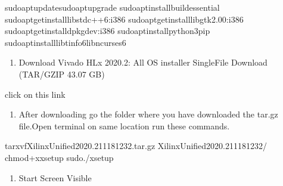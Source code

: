 \documentclass[letterpaper,10pt,english]{sphinxmanual}
\begin{document}
\begin{sphinxVerbatim}[commandchars=\\\{\}]
sudoaptupdatesudoaptupgrade
sudoaptinstallbuild\PYGZhy{}essential
sudoapt\PYGZhy{}getinstalllibstdc++6:i386
sudoapt\PYGZhy{}getinstalllibgtk2.0\PYGZhy{}0:i386
sudoapt\PYGZhy{}getinstalldpkg\PYGZhy{}dev:i386
sudoaptinstallpython3\PYGZhy{}pip
sudoaptinstalllibtinfo6libncurses6
\end{sphinxVerbatim}
\begin{enumerate}
%
\setcounter{enumi}{1}
\item {} 
\sphinxAtStartPar
Download Vivado HLx 2020.2: All OS installer Single\sphinxhyphen{}File Download (TAR/GZIP \sphinxhyphen{} 43.07 GB)

\end{enumerate}

\sphinxAtStartPar
click on this link 

\begin{figure}[htbp]
\centering

\noindent{}
\end{figure}
\begin{enumerate}
%
\setcounter{enumi}{2}
\item {} 
\sphinxAtStartPar
After downloading go the folder where you have downloaded the tar.gz file.Open terminal on same location run these commands.

\end{enumerate}

\begin{sphinxVerbatim}[commandchars=\\\{\}]
tar\PYGZhy{}xvfXilinx\PYGZus{}Unified\PYGZus{}2020.2\PYGZus{}1118\PYGZus{}1232.tar.gz
Xilinx\PYGZus{}Unified\PYGZus{}2020.2\PYGZus{}1118\PYGZus{}1232/
chmod+xxsetup
sudo./xsetup
\end{sphinxVerbatim}
\begin{enumerate}
%
\setcounter{enumi}{3}
\item {} 
\sphinxAtStartPar
Start Screen Visible

\end{enumerate}
\end{document}
